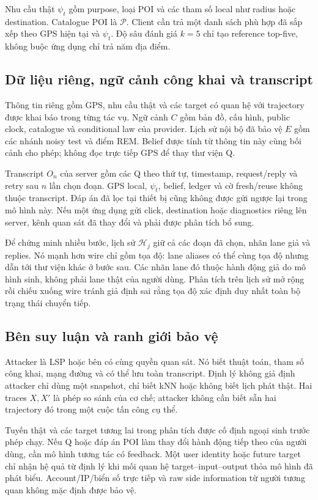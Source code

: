 Nhu cầu thật $\psi_t$ gồm purpose, loại POI và các tham số local như radius hoặc destination. Catalogue
POI là $\mathcal P$. Client cần trả một danh sách phù hợp đã sắp xếp theo GPS hiện tại và $\psi_t$.
Độ sâu đánh giá $k=5$ chỉ tạo reference top-five, không buộc ứng dụng chỉ trả năm địa điểm.

\subsection{Dữ liệu riêng, ngữ cảnh công khai và transcript}
Thông tin riêng gồm GPS, nhu cầu thật và các target có quan hệ với trajectory được khai báo trong
từng tác vụ. Ngữ cảnh $C$ gồm bản đồ, cấu hình, public clock, catalogue và conditional law của provider.
Lịch sử nội bộ đã bảo vệ $E$ gồm các nhánh noisy test và điểm REM. Belief được tính từ thông tin
này cùng bối cảnh cho phép; không đọc trực tiếp GPS để thay thư viện Q.

Transcript $O_n$ của server gồm các Q theo thứ tự, timestamp, request/reply và retry sau $n$ lần chọn
đoạn. GPS local, $\psi_t$, belief, ledger và cờ fresh/reuse không thuộc transcript. Đáp án đã lọc tại
thiết bị cũng không được gửi ngược lại trong mô hình này. Nếu một ứng dụng gửi click, destination
hoặc diagnostics riêng lên server, kênh quan sát đã thay đổi và phải được phân tích bổ sung.

Để chứng minh nhiều bước, lịch sử $\mathcal H_j$ giữ cả các đoạn đã chọn, nhãn lane giả và replies.
Nó mạnh hơn wire chỉ gồm tọa độ: lane aliases có thể cùng tọa độ nhưng dẫn tới thư viện khác ở bước
sau. Các nhãn lane đó thuộc hành động giả do mô hình sinh, không phải lane thật của người dùng.
Phân tích trên lịch sử mở rộng rồi chiếu xuống wire tránh giả định sai rằng tọa độ xác định duy nhất
toàn bộ trạng thái chuyển tiếp.

\subsection{Bên suy luận và ranh giới bảo vệ}
Attacker là LSP hoặc bên có cùng quyền quan sát. Nó biết thuật toán, tham số công khai, mạng đường
và có thể lưu toàn transcript. Định lý không giả định attacker chỉ dùng một snapshot, chỉ biết kNN
hoặc không biết lịch phát thật. Hai traces $X,X'$ là phép so sánh của cơ chế; attacker không cần biết
sẵn hai trajectory đó trong một cuộc tấn công cụ thể.

Tuyến thật và các target tương lai trong phân tích được cố định ngoại sinh trước phép chạy. Nếu Q
hoặc đáp án POI làm thay đổi hành động tiếp theo của người dùng, cần mô hình tương tác có feedback.
Một user identity hoặc future target chỉ nhận hệ quả từ định lý khi mối quan hệ target--input--output
thỏa mô hình đã phát biểu. Account/IP/biển số trực tiếp và raw side information từ người tương quan
không mặc định được bảo vệ.

